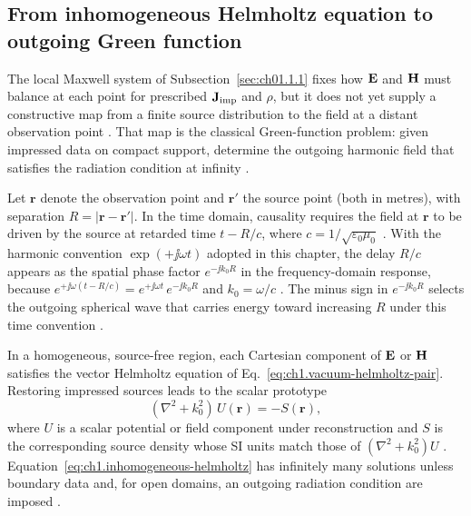 \subsection{From inhomogeneous Helmholtz equation to outgoing Green function}
\label{sec:ch01.1.1c}

The local Maxwell system of Subsection~\ref{sec:ch01.1.1} fixes how $\mathbf{E}$ and $\mathbf{H}$ must balance at each point for prescribed $\mathbf{J}_{\mathrm{imp}}$ and $\rho$, but it does not yet supply a constructive map from a finite source distribution to the field at a distant observation point \cite{stratton1941,maxwell1873}. That map is the classical Green-function problem: given impressed data on compact support, determine the outgoing harmonic field that satisfies the radiation condition at infinity \cite{stratton1941,jackson1999}.

Let $\mathbf{r}$ denote the observation point and $\mathbf{r}'$ the source point (both in metres), with separation $R=|\mathbf{r}-\mathbf{r}'|$. In the time domain, causality requires the field at $\mathbf{r}$ to be driven by the source at retarded time $t-R/c$, where $c=1/\sqrt{\varepsilon_0\mu_0}$ \cite{stratton1941,jackson1999}. With the harmonic convention $\exp(+\jj\omega t)$ adopted in this chapter, the delay $R/c$ appears as the spatial phase factor $e^{-\jj k_0 R}$ in the frequency-domain response, because $e^{+\jj\omega(t-R/c)}=e^{+\jj\omega t}\,e^{-\jj k_0 R}$ and $k_0=\omega/c$ \cite{stratton1941}. The minus sign in $e^{-\jj k_0 R}$ selects the outgoing spherical wave that carries energy toward increasing $R$ under this time convention \cite{stratton1941,jackson1999}.

In a homogeneous, source-free region, each Cartesian component of $\mathbf{E}$ or $\mathbf{H}$ satisfies the vector Helmholtz equation of Eq.~\eqref{eq:ch1.vacuum-helmholtz-pair}. Restoring impressed sources leads to the scalar prototype
\begin{equation}
\label{eq:ch1.inhomogeneous-helmholtz}
(\nabla^2+k_0^2)\,U(\mathbf{r})=-S(\mathbf{r}),
\end{equation}
where $U$ is a scalar potential or field component under reconstruction and $S$ is the corresponding source density whose SI units match those of $(\nabla^2+k_0^2)U$ \cite{stratton1941,jackson1999}. Equation~\eqref{eq:ch1.inhomogeneous-helmholtz} has infinitely many solutions unless boundary data and, for open domains, an outgoing radiation condition are imposed \cite{stratton1941}.

